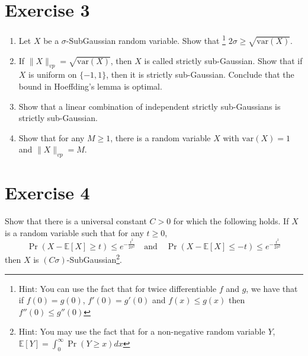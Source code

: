 \documentclass[a4 paper]{article}
\numberwithin{equation}{section}
\theoremstyle{boldStyle}
\theoremstyle{boldBlueStyle}
\theoremstyle{boldPurpleStyle}
\theoremstyle{boldRedStyle}
\begin{document}
\section*{Exercise 3}
\begin{enumerate}
\item \textcolor{blueColor}{Let \(X\) be a \(\sigma\)-SubGaussian random variable. Show that
\footnote{Hint: You can use the fact that for twice differentiable \( f \) and \( g \), we have that if \( f(0) = g(0) \), \( f'(0) = g'(0) \) and \( f(x) \leq g(x) \) then \( f''(0) \leq g''(0) \)}
\(2\sigma \geq \sqrt{\mathrm{var}(X)}\).}












\newpage
\item \textcolor{blueColor}{If \(\|X\|_{vp} = \sqrt{\mathrm{var}(X)}\), then \(X\) is called strictly sub-Gaussian. 
Show that if \(X\) is uniform on \(\{-1, 1\}\), then it is strictly sub-Gaussian. Conclude that the bound in Hoeffding's lemma is optimal.}






\newpage
\item \textcolor{blueColor}{Show that a linear combination of independent strictly sub-Gaussians is strictly sub-Gaussian.}





\newpage
\item \textcolor{blueColor}{Show that for any \(M \geq 1\), there is a random variable \(X\) with \(\mathrm{var}(X) = 1\) and \(\|X\|_{vp} = M\).}








\end{enumerate}

\newpage
\section*{Exercise 4}
\textcolor{blueColor}{
Show that there is a universal constant \(C > 0\) for which the following holds. If \(X\) is a random variable such that for any \(t \geq 0\),
\[
\Pr(X - \mathbb{E}[X] \geq t) \leq e^{-\frac{t^2}{2\sigma^2}} \quad \text{and} \quad \Pr(X - \mathbb{E}[X] \leq -t) \leq e^{-\frac{t^2}{2\sigma^2}}
\]
then \(X\) is \((C\sigma)\)-SubGaussian\footnote{Hint: You may use the fact that for a non-negative random variable \(Y\), \(\mathbb{E}[Y] = \int_0^\infty \Pr(Y \geq x)dx\)}.
}
\end{document}
